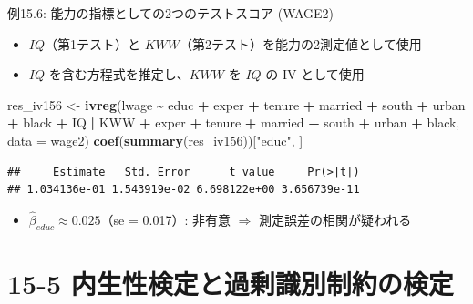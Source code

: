 \documentclass[
  ignorenonframetext,
]{beamer}
\newenvironment{Shaded}{\begin{snugshade}}{\end{snugshade}}
\newcommand{\AttributeTok}[1]{\textcolor[rgb]{0.13,0.29,0.53}{#1}}
\newcommand{\FunctionTok}[1]{\textcolor[rgb]{0.13,0.29,0.53}{\textbf{#1}}}
\newcommand{\NormalTok}[1]{#1}
\newcommand{\OtherTok}[1]{\textcolor[rgb]{0.56,0.35,0.01}{#1}}
\newcommand{\SpecialCharTok}[1]{\textcolor[rgb]{0.81,0.36,0.00}{\textbf{#1}}}
\newcommand{\StringTok}[1]{\textcolor[rgb]{0.31,0.60,0.02}{#1}}
\providecommand{\tightlist}{%
  \setlength{\itemsep}{0pt}\setlength{\parskip}{0pt}}
\begin{document}
\begin{frame}[fragile]{例15.6: 能力の指標としての2つのテストスコア
(WAGE2)}
\label{ux4f8b15.6-ux80fdux529bux306eux6307ux6a19ux3068ux3057ux3066ux306e2ux3064ux306eux30c6ux30b9ux30c8ux30b9ux30b3ux30a2-wage2}
\begin{itemize}
\tightlist
\item
  \(IQ\)（第1テスト）と \(KWW\)（第2テスト）を能力の2測定値として使用
\item
  \(IQ\) を含む方程式を推定し、\(KWW\) を \(IQ\) の IV として使用
\end{itemize}

\footnotesize

\begin{Shaded}
\begin{Highlighting}[]
\NormalTok{res\_iv156 }\OtherTok{\textless{}{-}} \FunctionTok{ivreg}\NormalTok{(lwage }\SpecialCharTok{\textasciitilde{}}\NormalTok{ educ }\SpecialCharTok{+}\NormalTok{ exper }\SpecialCharTok{+}\NormalTok{ tenure }\SpecialCharTok{+}\NormalTok{ married }\SpecialCharTok{+}
\NormalTok{                     south }\SpecialCharTok{+}\NormalTok{ urban }\SpecialCharTok{+}\NormalTok{ black }\SpecialCharTok{+}\NormalTok{ IQ }\SpecialCharTok{|}
\NormalTok{                     KWW }\SpecialCharTok{+}\NormalTok{ exper }\SpecialCharTok{+}\NormalTok{ tenure }\SpecialCharTok{+}\NormalTok{ married }\SpecialCharTok{+}
\NormalTok{                     south }\SpecialCharTok{+}\NormalTok{ urban }\SpecialCharTok{+}\NormalTok{ black,}
                   \AttributeTok{data =}\NormalTok{ wage2)}
\FunctionTok{coef}\NormalTok{(}\FunctionTok{summary}\NormalTok{(res\_iv156))[}\StringTok{"educ"}\NormalTok{, ]}
\end{Highlighting}
\end{Shaded}

\begin{verbatim}
##     Estimate   Std. Error      t value     Pr(>|t|) 
## 1.034136e-01 1.543919e-02 6.698122e+00 3.656739e-11
\end{verbatim}

\normalsize

\begin{itemize}
\tightlist
\item
  \(\hat{\beta}_{educ} \approx 0.025\)（se = 0.017）: 非有意
  \(\Rightarrow\) 測定誤差の相関が疑われる
\end{itemize}
\end{frame}

\section{15-5
内生性検定と過剰識別制約の検定}\label{ux5185ux751fux6027ux691cux5b9aux3068ux904eux5270ux8b58ux5225ux5236ux7d04ux306eux691cux5b9a}
\end{document}
